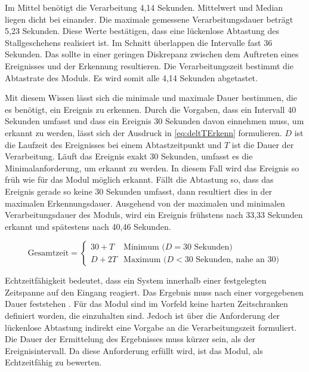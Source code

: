 Im Mittel benötigt die Verarbeitung 4,14 Sekunden. Mittelwert und Median liegen dicht bei einander. Die maximale gemessene Verarbeitungsdauer beträgt 5,23 Sekunden. Diese Werte bestätigen, dass eine lückenlose Abtastung des Stallgeschehens realisiert ist. Im Schnitt überlappen die Intervalle fast 36 Sekunden. Das sollte in einer geringen Diskrepanz zwischen dem Auftreten eines Ereignisses und der Erkennung resultieren. Die Verarbeitungszeit bestimmt die Abtastrate des Moduls. Es wird somit alle 4,14 Sekunden abgetastet. \par

Mit diesem Wissen lässt sich die minimale und maximale Dauer bestimmen, die es benötigt, ein Ereignis zu erkennen. Durch die Vorgaben, dass ein Intervall 40 Sekunden umfasst und dass ein Ereignis 30 Sekunden davon einnehmen muss, um erkannt zu werden, lässt sich der Ausdruck in \ref{eq:deltTErkenn} formulieren. \(D\) ist die Laufzeit des Ereignisses bei einem Abtastzeitpunkt und \(T\) ist die Dauer der Verarbeitung. Läuft das Ereignis exakt 30 Sekunden, umfasst es die Minimalanforderung, um erkannt zu werden. In diesem Fall wird das Ereignis so früh wie für das Modul möglich erkannt. Fällt die Abtastung so, dass das Ereignis gerade so keine 30 Sekunden umfasst, dann resultiert dies in der maximalen Erkennungsdauer. Ausgehend von der maximalen und minimalen Verarbeitungsdauer des Moduls, wird ein Ereignis frühstens nach 33,33 Sekunden erkannt und spätestens nach 40,46 Sekunden.

\begin{equation}
    \label{eq:deltTErkenn}
    \text{Gesamtzeit} = 
    \begin{cases} 
    30 + T & \text{Minimum (} D = 30 \text{ Sekunden)} \\
    D + 2T & \text{Maximum (} D < 30 \text{ Sekunden, nahe an 30)}
    \end{cases}
\end{equation}

 Echtzeitfähigkeit bedeutet, dass ein System innerhalb einer festgelegten Zeitspanne auf den Eingang reagiert. Das Ergebnis muss nach einer vorgegebenen Dauer feststehen \cite{Scholz.2005}. Für das Modul sind im Vorfeld keine harten Zeitschranken definiert worden, die einzuhalten sind. Jedoch ist über die Anforderung der lückenlose Abtastung indirekt eine Vorgabe an die Verarbeitungszeit formuliert. Die Dauer der Ermittelung des Ergebnisses muss kürzer sein, als der Ereignisintervall. Da diese Anforderung erfüllt wird, ist das Modul, als Echtzeitfähig zu bewerten. 


